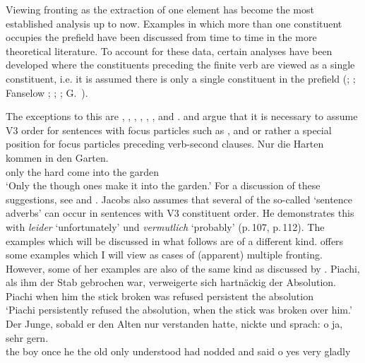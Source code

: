 Viewing fronting as the extraction of one element has become the most established analysis up to now.
Examples in which more than one constituent occupies the prefield have been discussed from time to time in the 
more theoretical literature. To account for these data, certain analyses have been developed where the 
constituents preceding the finite verb are viewed as a single constituent, i.e. it is assumed there is 
only a single constituent in the prefield (\citealp[]{Haider82}; \citealp[]{Wunderlich84}; 
Fanselow \citeyear[--100]{Fanselow87a}; \citeyear[Chapter~3]{Fanselow93a}; \citealp[]{Hoberg97a}; G.\ \citealp[Chapter~5.3]{GMueller98a}).

The exceptions to this are \citet{Grubacic65a}, \citet{Lee75a}, \citet{Loetscher85a}, \citet[]{Eisenberg94a}, \citet{Jacobs86a}, \citet{BH2001a}, and \citet{Speyer2008a}. 
\citet{Jacobs86a} and \citet{BH2001a} argue that it is necessary to assume V3 order for sentences with focus particles such as ,  and  or rather
a special position for focus particles preceding verb-second clauses.
\ea
\label{ex-v3-particles-jacobs}
\gll Nur die Harten kommen in den Garten.\\
     only the hard come into the garden\\
\glt `Only the though ones make it into the garden.'
\z
For a discussion of these suggestions, see  and .
Jacobs also assumes that several of the so-called `sentence adverbs' can occur in sentences with V3 constituent order.
He demonstrates this with \emph{leider} `unfortunately' und \emph{vermutlich} `probably' (p.\,107, p.\,112).
The examples which will be discussed in what follows are of a different kind. \citet{Grubacic65a} offers some examples which
I will view as cases of (apparent) multiple fronting. However, some of her examples are also of the same kind as discussed by \citet{Lee75a}.
\eal
\ex 
\gll Piachi, als ihm der Stab gebrochen war, verweigerte sich hartnäckig der Absolution.\footnotemark\\
     Piachi  when him the stick broken was   refused     \self{} persistent the absolution\\
\glt `Piachi persistently refused the absolution, when the stick was broken over him.'
\ex  
\gll Der Junge, sobald er den Alten nur verstanden hatte, nickte und sprach: o ja, sehr gern.\footnotemark\\
     the boy    once   he the old only understood had    nodded and said    o yes very gladly\\
